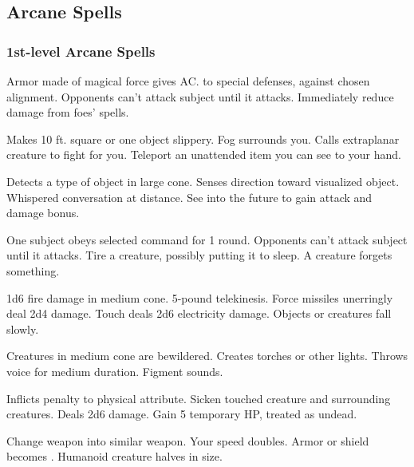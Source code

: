 \subsection{Arcane Spells}\label{Arcane Spells}
\subsubsection{1st-level Arcane Spells}
\begin{swspelllist}
     Armor made of magical force gives  AC.
    to special defenses,  against chosen alignment.
   Opponents can't attack subject until it attacks.
   Immediately reduce damage from foes' spells.

   Makes 10 ft. square or one object slippery.
   Fog surrounds you.
   Calls extraplanar creature to fight for you.
   Teleport an unattended item you can see to your hand.

   Detects a type of object in large cone.
   Senses direction toward visualized object.
   Whispered conversation at distance.
   See into the future to gain attack and damage bonus.

   One subject obeys selected command for 1 round.
   Opponents can't attack subject until it attacks.
   Tire a creature, possibly putting it to sleep.
   A creature forgets something.

   1d6 fire damage in medium cone.
   5-pound telekinesis.
   Force missiles unerringly deal 2d4 damage.
   Touch deals 2d6 electricity damage.
   Objects or creatures fall slowly.

   Creatures in medium cone are bewildered.
   Creates torches or other lights.
   Throws voice for medium duration.
   Figment sounds.

   Inflicts  penalty to physical attribute.
   Sicken touched creature and surrounding creatures.
   Deals 2d6 damage.
   Gain 5 temporary HP, treated as undead.

   Change weapon into similar weapon.
   Your speed doubles.
   Armor or shield becomes .
   Humanoid creature halves in size.
\end{swspelllist}

